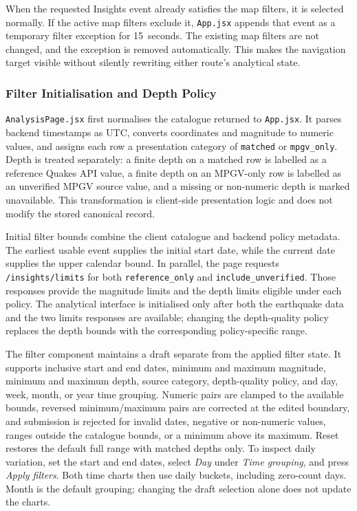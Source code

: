 \documentclass[12pt]{article}
\begin{document}
When the requested Insights event already satisfies the map filters, it is selected normally. If the active map filters exclude it, \texttt{App.jsx} appends that event as a temporary filter exception for 15~seconds. The existing map filters are not changed, and the exception is removed automatically. This makes the navigation target visible without silently rewriting either route's analytical state.

\subsubsection{Filter Initialisation and Depth Policy}

\texttt{AnalysisPage.jsx} first normalises the catalogue returned to \texttt{App.jsx}. It parses backend timestamps as UTC, converts coordinates and magnitude to numeric values, and assigns each row a presentation category of \texttt{matched} or \texttt{mpgv\_only}. Depth is treated separately: a finite depth on a matched row is labelled as a reference Quakes API value, a finite depth on an MPGV-only row is labelled as an unverified MPGV source value, and a missing or non-numeric depth is marked unavailable. This transformation is client-side presentation logic and does not modify the stored canonical record.

Initial filter bounds combine the client catalogue and backend policy metadata. The earliest usable event supplies the initial start date, while the current date supplies the upper calendar bound. In parallel, the page requests \texttt{/insights/limits} for both \texttt{reference\_only} and \texttt{include\_unverified}. Those responses provide the magnitude limits and the depth limits eligible under each policy. The analytical interface is initialised only after both the earthquake data and the two limits responses are available; changing the depth-quality policy replaces the depth bounds with the corresponding policy-specific range.

The filter component maintains a draft separate from the applied filter state. It supports inclusive start and end dates, minimum and maximum magnitude, minimum and maximum depth, source category, depth-quality policy, and day, week, month, or year time grouping. Numeric pairs are clamped to the available bounds, reversed minimum/maximum pairs are corrected at the edited boundary, and submission is rejected for invalid dates, negative or non-numeric values, ranges outside the catalogue bounds, or a minimum above its maximum. Reset restores the default full range with matched depths only. To inspect daily variation, set the start and end dates, select \emph{Day} under \emph{Time grouping}, and press \emph{Apply filters}. Both time charts then use daily buckets, including zero-count days. Month is the default grouping; changing the draft selection alone does not update the charts.
\end{document}
